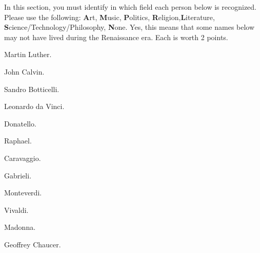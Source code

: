 \documentclass[12pt]{examdesign}
\begin{document}
\begin{truefalse}[title={People}]
	In this section, you must identify in which field each person below is recognized. Please use the following: \textbf{A}rt, \textbf{M}usic, \textbf{P}olitics, \textbf{R}eligion,\textbf{L}iterature, \textbf{S}cience/Technology/Philosophy, \textbf{N}one. Yes, this means that some names below may not have lived during the Renaissance era. Each is worth 2 points.

	\begin{question}
		 Martin Luther.
	\end{question}

	\begin{question}
		 John Calvin.
	\end{question}

	\begin{question}
		 Sandro Botticelli.
	\end{question}

	\begin{question}
		 Leonardo da Vinci.
	\end{question}

	\begin{question}
		 Donatello.
	\end{question}

	\begin{question}
		 Raphael.
	\end{question}

	\begin{question}
		 Caravaggio.
	\end{question}

	\begin{question}
		 Gabrieli.
	\end{question}

	\begin{question}
		 Monteverdi.
	\end{question}

	\begin{question}
		 Vivaldi.
	\end{question}

	\begin{question}
		 Madonna.
	\end{question}

	\begin{question}
		 Geoffrey Chaucer.
	\end{question}


\end{truefalse}
\end{document}
